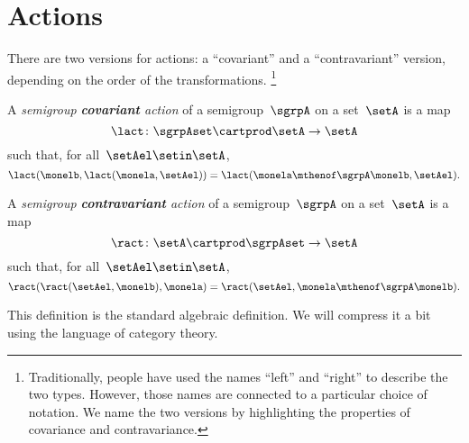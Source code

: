 
\section{Actions}
\label{sec:actions}

There are two versions for actions: a ``covariant'' and a ``contravariant'' version, depending on the order of the transformations.
\footnote{
    Traditionally, people have used the names ``left'' and ``right'' to describe the two types.
    However, those names are connected to a particular choice of notation.
    We name the two versions by highlighting the properties of covariance and contravariance.
}

\begin{ctdefinition}
    \label{def:semigroup-cov-action-prelim}
    A \emph{semigroup \textbf{covariant} action} of a semigroup~$\sgrpA$ on a set~$\setA$ is a map
    \begin{equation}
        \label{eq:lact}
        \lact \colon \sgrpAset \cartprod \setA \to \setA
    \end{equation}
    such that, for all~$\setAel \setin \setA$,
    \begin{equation}
        \label{eq:lact1cond}
        \lact(\monelb, \lact(\monela, \setAel)) = \lact(\monela \mthenof\sgrpA \monelb, \setAel).
    \end{equation}
\end{ctdefinition}

\begin{ctdefinition}
    \label{def:semigroup-contra-action-prelim}
    A \emph{semigroup \textbf{contravariant} action} of a semigroup~$\sgrpA$ on a set~$\setA$ is a map
    \begin{equation}
        \label{eq:ract}
        \ract \colon \setA \cartprod \sgrpAset \to \setA
    \end{equation}
    such that, for all~$\setAel \setin \setA$,
    \begin{equation}
        \label{eq:ract1cond}
        \ract(\ract(\setAel, \monelb), \monela) = \ract(\setAel, \monela \mthenof\sgrpA \monelb).
    \end{equation}
\end{ctdefinition}

This definition is the standard algebraic definition.
We will compress it a bit using the language of category theory.

